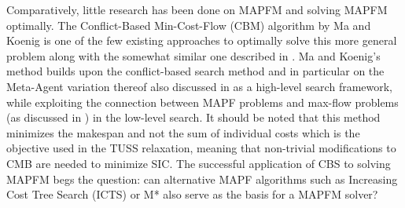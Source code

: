 \documentclass[english]{article}
\begin{document}
	Comparatively, little research has been done on MAPFM and solving MAPFM optimally.
	The Conflict-Based Min-Cost-Flow (CBM) algorithm by Ma and Koenig \cite{ma2016} is one of the few existing approaches to optimally solve this more general problem along with the somewhat similar one described in \cite{henkel2019}.
	Ma and Koenig's method builds upon the conflict-based search method and in particular on the Meta-Agent variation thereof also discussed in \cite{sharon2015} as a high-level search framework, while exploiting the connection between MAPF problems and max-flow problems (as discussed in \cite{yu2013}) in the low-level search. It should be noted that this method minimizes the makespan and not the sum of individual costs which is the objective used in the TUSS relaxation, meaning that non-trivial modifications to CMB are needed to minimize SIC.
	The successful application of CBS to solving MAPFM begs the question: can alternative MAPF algorithms such as Increasing Cost Tree Search (ICTS) \cite{sharon2011} or M* \cite{wagner2011} also serve as the basis for a MAPFM solver?
	
\end{document}

